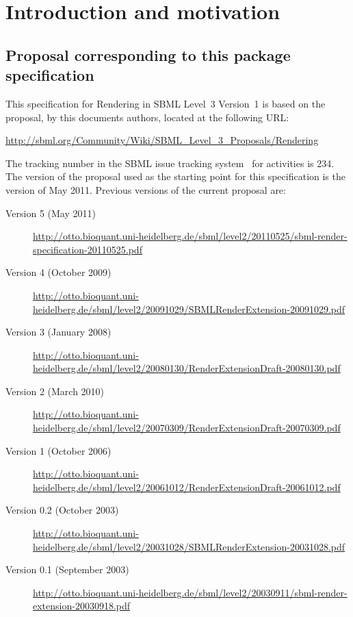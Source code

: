 
\section{Introduction and motivation} \label{intro} 


\subsection{Proposal corresponding to this package specification} 

This specification for Rendering in SBML Level~3 
Version~1 is based on the proposal, by this documents authors, located 
at the following URL: 
\begin{center} 
  \vspace*{1ex}\small 
  \url{http://sbml.org/Community/Wiki/SBML_Level_3_Proposals/Rendering} 
  \vspace*{1ex} 
\end{center} 

The tracking number in the SBML issue tracking system~\citep{tracker} 
for \RenderPackage activities is 234. The version of the proposal used 
as the starting point for this specification is the version of May 
2011. Previous versions of the current proposal are: 

\begin{description} 
  \item[Version 5 (May 2011)] 
  \item [] \small{\url{http://otto.bioquant.uni-heidelberg.de/sbml/level2/20110525/sbml-render-specification-20110525.pdf}} 
  \item[Version 4 (October 2009)] 
  \item [] \small{\url{http://otto.bioquant.uni-heidelberg.de/sbml/level2/20091029/SBMLRenderExtension-20091029.pdf}} 
  \item[Version 3 (January 2008)] 
  \item [] \small{\url{http://otto.bioquant.uni-heidelberg.de/sbml/level2/20080130/RenderExtensionDraft-20080130.pdf}} 
	\item[Version 2 (March 2010)] 
  \item [] \small{\url{http://otto.bioquant.uni-heidelberg.de/sbml/level2/20070309/RenderExtensionDraft-20070309.pdf}} 
	\item[Version 1 (October 2006)] 
  \item [] \small{\url{http://otto.bioquant.uni-heidelberg.de/sbml/level2/20061012/RenderExtensionDraft-20061012.pdf}} 
	\item[Version 0.2 (October 2003)] 
  \item [] \small{\url{http://otto.bioquant.uni-heidelberg.de/sbml/level2/20031028/SBMLRenderExtension-20031028.pdf}} 
	\item[Version 0.1 (September 2003)] 
  \item [] \small{\url{http://otto.bioquant.uni-heidelberg.de/sbml/level2/20030911/sbml-render-extension-20030918.pdf}} 
\end{description} 

